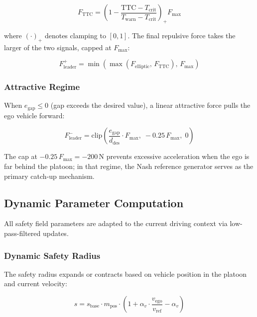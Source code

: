 \documentclass[12pt,a4paper,oneside]{report}
\begin{document}
\begin{equation}
F_{\mathrm{TTC}} = \left(1 - \frac{\mathrm{TTC} - T_{\mathrm{crit}}}{T_{\mathrm{warn}} - T_{\mathrm{crit}}}\right)_{\!+} F_{\max}
\label{eq:ttc_floor}
\end{equation}

where $(\cdot)_+$ denotes clamping to $[0, 1]$. The final repulsive force takes the larger of the two signals, capped at $F_{\max}$:

\begin{equation}
F_{\mathrm{leader}}^{+} = \min\!\left(\max\!\left(F_{\mathrm{elliptic}},\, F_{\mathrm{TTC}}\right),\, F_{\max}\right)
\label{eq:leader_repulsive}
\end{equation}

\subsubsection{Attractive Regime}

When $e_{\mathrm{gap}} \leq 0$ (gap exceeds the desired value), a linear attractive force pulls the ego vehicle forward:

\begin{equation}
F_{\mathrm{leader}}^{-} = \mathrm{clip}\!\left(\frac{e_{\mathrm{gap}}}{d_{\mathrm{des}}} \cdot F_{\max},\; -0.25\,F_{\max},\; 0\right)
\label{eq:attractive_force}
\end{equation}

The cap at $-0.25\,F_{\max} = -200\,\mathrm{N}$ prevents excessive acceleration when the ego is far behind the platoon; in that regime, the Nash reference generator serves as the primary catch-up mechanism.


\subsection{Dynamic Parameter Computation}

All safety field parameters are adapted to the current driving context via low-pass-filtered updates.

\subsubsection{Dynamic Safety Radius}

The safety radius expands or contracts based on vehicle position in the platoon and current velocity:

\begin{equation}
s = s_{\text{base}} \cdot m_{\text{pos}} \cdot \left(1 + \alpha_v \cdot \frac{v_{\text{ego}}}{v_{\text{ref}}} - \alpha_v\right)
\label{eq:dynamic_radius_impl}
\end{equation}
\end{document}
